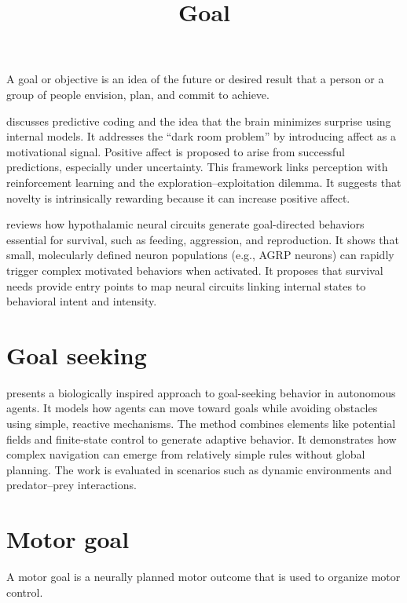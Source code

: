 \documentclass[a4paper]{article}
\title{Goal}
\date{}
\begin{document}
    \maketitle
    A goal or objective is an idea of the future or desired result that a person or a group of people envision, plan, and commit to achieve. 
    
    \cite{trapp-2017-commentary-on-the-joys-of-perceiving-affect-as-feedback-for-perceptual-predictions} discusses predictive coding and the idea that the brain minimizes surprise using internal models. It addresses the “dark room problem” by introducing affect as a motivational signal. Positive affect is proposed to arise from successful predictions, especially under uncertainty. This framework links perception with reinforcement learning and the exploration–exploitation dilemma. It suggests that novelty is intrinsically rewarding because it can increase positive affect.
    
    \cite{sternson-2013-hypothalamic-survival-circuits-blueprints-for-purposive-behaviors} reviews how hypothalamic neural circuits generate goal-directed behaviors essential for survival, such as feeding, aggression, and reproduction.
    It shows that small, molecularly defined neuron populations (e.g., AGRP neurons) can rapidly trigger complex motivated behaviors when activated.
    It proposes that survival needs provide entry points to map neural circuits linking internal states to behavioral intent and intensity.
    
    
    \section{Goal seeking}
        \cite{kerr-2017-biological-goal-seeking} presents a biologically inspired approach to goal-seeking behavior in autonomous agents. It models how agents can move toward goals while avoiding obstacles using simple, reactive mechanisms. The method combines elements like potential fields and finite-state control to generate adaptive behavior.
        It demonstrates how complex navigation can emerge from relatively simple rules without global planning. The work is evaluated in scenarios such as dynamic environments and predator–prey interactions.
        
    \section{Motor goal}
        A motor goal is a neurally planned motor outcome that is used to organize motor control.
        
        
        
        
\end{document}
